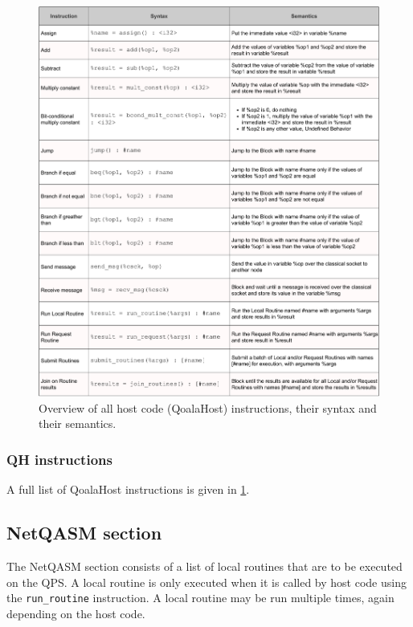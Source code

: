\begin{figure}
    \centering
    \includegraphics[width=1.0\textwidth]{figures/qoala/qh_table.pdf}
    \caption{Overview of all host code (QoalaHost) instructions, their syntax and their semantics.}
    \label{qoala:fig:app:qh_table}
\end{figure}

\subsubsection{QH instructions}
A full list of QoalaHost instructions is given in \cref{qoala:fig:app:qh_table}.


\subsection{NetQASM section}
\label{qoala:sec:app:netqasm}
The NetQASM section consists of a list of local routines that are to be executed on the QPS.
A local routine is only executed when it is called by host code using the \texttt{run\_routine} instruction. A local routine may be run multiple times, again depending on the host code.

